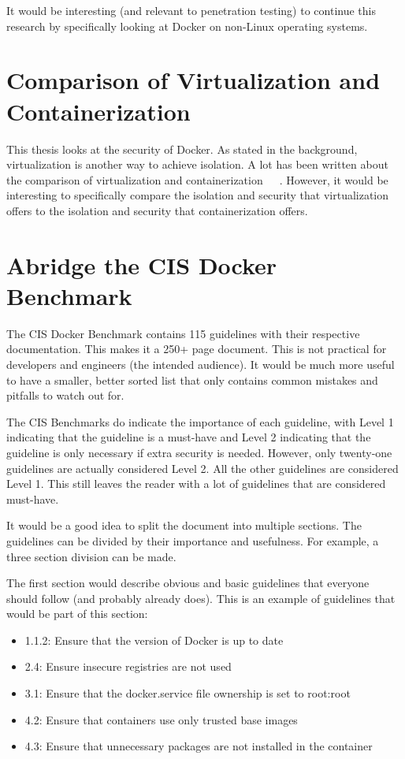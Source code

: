 It would be interesting (and relevant to penetration testing) to continue this research by specifically looking at Docker on non-Linux operating systems.

\section{Comparison of Virtualization and Containerization}
This thesis looks at the security of Docker. As stated in the background, virtualization is another way to achieve isolation. A lot has been written about the comparison of virtualization and containerization~\cite{Virtualization-vs-Containerization-to-Support-PaaS}~\cite{Hypervisor-vs-Lightweight-Virtualization}~\cite{Updated-Performance-Comparison-Virtual-Machines-Containers}.
However, it would be interesting to specifically compare the isolation and security that virtualization offers to the isolation and security that containerization offers.

\section{Abridge the CIS Docker Benchmark}\label{futurework:CIS}
The CIS Docker Benchmark contains 115 guidelines with their respective documentation.
This makes it a 250+ page document. This is not practical for developers and engineers (the intended audience). It would be much more useful to have a smaller, better sorted list that only contains common mistakes and pitfalls to watch out for.

\medskip

The CIS Benchmarks do indicate the importance of each guideline, with Level 1 indicating that the guideline is a must-have and Level 2 indicating that the guideline is only necessary if extra security is needed. However, only twenty-one guidelines are actually considered Level 2. All the other guidelines are considered Level 1. This still leaves the reader with a lot of guidelines that are considered must-have.

\medskip

It would be a good idea to split the document into multiple sections. The guidelines can be divided by their importance and usefulness. For example, a three section division can be made.

\medskip

The first section would describe obvious and basic guidelines that everyone should follow (and probably already does). This is an example of guidelines that would be part of this section:
\begin{itemize}
    \item 1.1.2: Ensure that the version of Docker is up to date
    \item 2.4: Ensure insecure registries are not used
    \item 3.1: Ensure that the docker.service file ownership is set to root:root
    \item 4.2: Ensure that containers use only trusted base images
    \item 4.3: Ensure that unnecessary packages are not installed in the container
\end{itemize}


